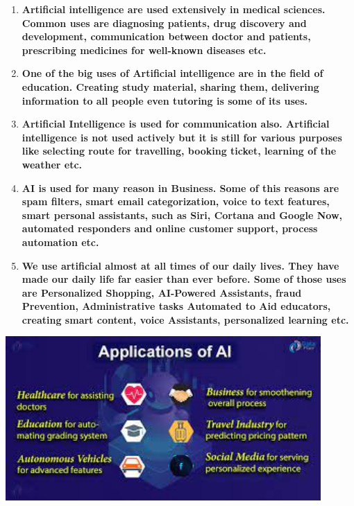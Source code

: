 \documentclass{article}
\begin{document}
\begin{enumerate}
\item  \textbf{ Artificial intelligence are used extensively in medical sciences. Common uses are diagnosing patients, drug discovery and development, communication between doctor and patients, prescribing medicines for well-known diseases etc.\underbar{}}

\item \textbf{ One of the big uses of Artificial intelligence are in the field of education. Creating study material, sharing them, delivering information to all people even tutoring is some of its uses.\underbar{}}

\item \textbf{ Artificial Intelligence is used for communication also. Artificial intelligence is not used actively but it is still for various purposes like selecting route for travelling, booking ticket, learning of the weather etc.\underbar{}}

\item \textbf{ AI is used for many reason in Business. Some of this reasons are} \textbf{spam filters, smart email categorization, voice to text features, smart personal assistants, such as Siri, Cortana and Google Now, automated responders and online customer support, process automation etc.}

\item \textbf{  We use artificial almost at all times of our daily lives. They have made our daily life far easier than ever before. Some of those uses are Personalized Shopping, AI-Powered Assistants, fraud Prevention, Administrative tasks Automated to Aid educators, creating smart content, voice Assistants, personalized learning etc.}
\end{enumerate}
\centering
\includegraphics[width=12cm]{uses of AI.jpg}\par
\end{document}
